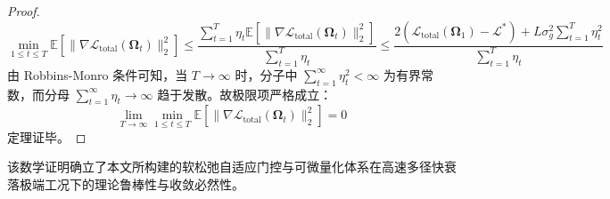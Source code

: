 \begin{proof}
\begin{equation}
  \min_{1 \le t \le T} \mathbb{E}[\|\nabla \mathcal{L}_{\text{total}}(\bm{\Omega}_t)\|_2^2] \le \frac{\sum_{t=1}^T \eta_t \mathbb{E}[\|\nabla \mathcal{L}_{\text{total}}(\bm{\Omega}_t)\|_2^2]}{\sum_{t=1}^T \eta_t} \le \frac{2(\mathcal{L}_{\text{total}}(\bm{\Omega}_1) - \mathcal{L}^*) + L \sigma_g^2 \sum_{t=1}^T \eta_t^2}{\sum_{t=1}^T \eta_t}
\end{equation}
由 Robbins-Monro 条件可知，当 $T \to \infty$ 时，分子中 $\sum_{t=1}^\infty \eta_t^2 < \infty$ 为有界常数，而分母 $\sum_{t=1}^\infty \eta_t \to \infty$ 趋于发散。故极限项严格成立：
\begin{equation}
  \lim_{T \to \infty} \min_{1 \le t \le T} \mathbb{E}[\|\nabla \mathcal{L}_{\text{total}}(\bm{\Omega}_t)\|_2^2] = 0
\end{equation}
定理证毕。
\end{proof}

该数学证明确立了本文所构建的软松弛自适应门控与可微量化体系在高速多径快衰落极端工况下的理论鲁棒性与收敛必然性。
